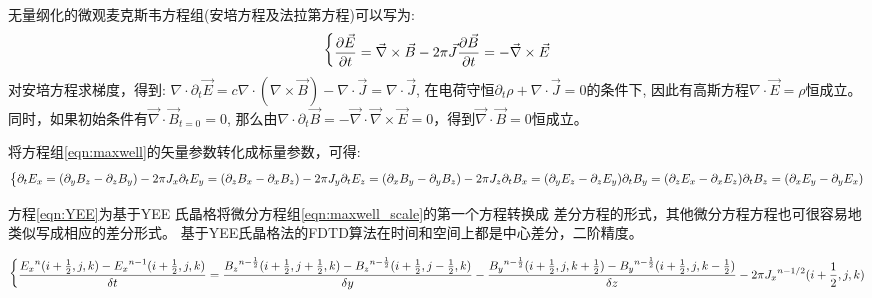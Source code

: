 无量纲化的微观麦克斯韦方程组(安培方程及法拉第方程)可以写为:  
\begin{equation}
\label{eqn:maxwell}
\begin{dcases*}
\frac{\partial{\vec{E}}}{\partial{t}} = \vec{\nabla} \times \vec{B} - 2 \pi \vec{J}
\frac{\partial{\vec{B}}}{\partial{t}} = -\vec{\nabla} \times \vec{E}
\end{dcases*}
\end{equation}  
对安培方程求梯度，得到:  
${\nabla} \cdot {\partial}_t \vec{E} = c {\nabla} \cdot ({\nabla} \times \vec{B})-{\nabla} \cdot \vec{J}={\nabla} \cdot \vec{J} $, 在电荷守恒${\partial}_t  \rho + {\nabla} \cdot \vec{J} =0 $的条件下, 因此有高斯方程${\nabla} \cdot \vec{E}=\rho $恒成立。同时，如果初始条件有$\vec{\nabla} \cdot \vec{B}_{t=0}=0$, 那么由$\nabla \cdot {\partial}_t \vec{B} = -\vec{\nabla} \cdot \vec{\nabla} \times \vec{E} =0$，得到$\vec{\nabla} \cdot \vec{B}=0$恒成立。



将方程组\ref{eqn:maxwell}的矢量参数转化成标量参数，可得:
\begin{equation}
\label{eqn:maxwell_scale}
\begin{dcases*}

\partial_t {E_x}=(\partial_y {B_z} - \partial_z {B_y}) - 2 \pi J_x
\partial_t {E_y}=(\partial_z {B_x} - \partial_x {B_z}) - 2 \pi J_y
\partial_t {E_z}=(\partial_x {B_y} - \partial_y {B_z}) - 2 \pi J_z
\partial_t {B_x}=(\partial_y {E_z} - \partial_z {E_y})
\partial_t {B_y}=(\partial_z {E_x} - \partial_x {E_z})
\partial_t {B_z}=(\partial_x {E_y} - \partial_y {E_x})

\end{dcases*}
\end{equation} 
  


方程\ref{eqn:YEE}为基于YEE 氏晶格将微分方程组\ref{eqn:maxwell_scale}的第一个方程转换成
差分方程的形式，其他微分方程方程也可很容易地类似写成相应的差分形式。
基于YEE氏晶格法的FDTD算法在时间和空间上都是中心差分，二阶精度。


\begin{equation}
\label{eqn:YEE}
\begin{dcases*}

\frac{{E_x}^{n}(i+\frac{1}{2},j,k)-{E_x}^{n-1}(i+\frac{1}{2},j,k) }{\delta t}=  \frac{{B_z}^{n-\frac{1}{2}}(i+\frac{1}{2},j+\frac{1}{2},k)-{B_z}^{n-\frac{1}{2}}(i+\frac{1}{2},j-\frac{1}{2},k) }{\delta y} -  \frac{{B_y}^{n-\frac{1}{2}}(i+\frac{1}{2},j,k+\frac{1}{2})-{B_y}^{n-\frac{1}{2}}(i+\frac{1}{2},j,k-\frac{1}{2}) }{\delta z}- 2 \pi {J_x}^{n-1/2}(i+\frac{1}{2},j,k)

\end{dcases*}
\end{equation} 





